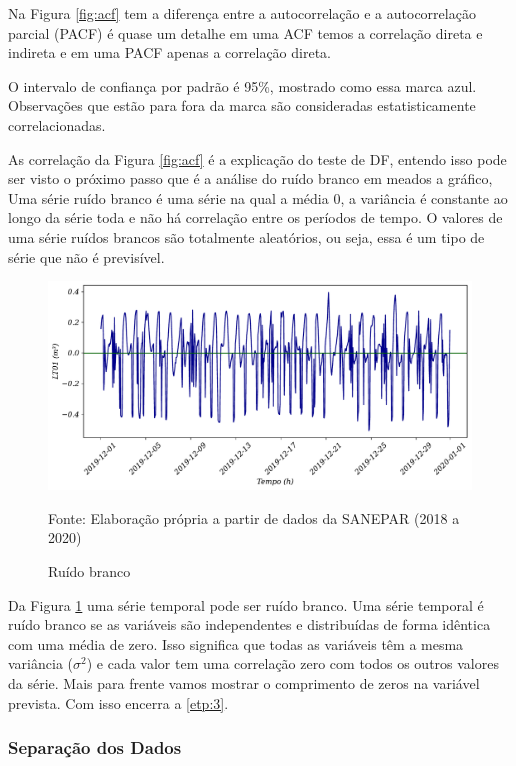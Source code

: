 Na Figura \ref{fig:acf} tem a diferença entre a autocorrelação e a autocorrelação parcial (PACF) é quase um detalhe em uma ACF temos a correlação direta e indireta e em uma PACF apenas a correlação direta. 

O intervalo de confiança por padrão é 95\%, mostrado como essa marca azul. Observações que estão para fora da marca são consideradas estatisticamente correlacionadas.

As correlação da Figura \ref{fig:acf} é a explicação do teste de DF, entendo isso pode ser visto o próximo passo que é  a análise do ruído branco em meados a gráfico, Uma série ruído branco é uma série na qual a média 0, a variância é constante ao longo da série toda e não há correlação entre os períodos de tempo. O valores de uma série ruídos brancos são totalmente aleatórios, ou seja, essa é um tipo de série que não é previsível.

\begin{figure}[H]
	\centering
	\caption{Ruído branco}
	\label{fig:ruido-branco}
	\includegraphics[width=1\linewidth]{Resultados/Figuras/ruido-branco}
	
	Fonte: Elaboração própria a partir de dados da SANEPAR (2018 a 2020)
\end{figure}

Da Figura \ref{fig:ruido-branco} uma série temporal pode ser ruído branco.
Uma série temporal é ruído branco se as variáveis são independentes e distribuídas de forma idêntica com uma média de zero.
Isso significa que todas as variáveis têm a mesma variância ($\sigma^2$) e cada valor tem uma correlação zero com todos os outros valores da série.
Mais para frente vamos mostrar o comprimento de zeros na variável prevista. Com isso encerra a \ref{etp:3}.

\subsubsection{Separa\c c\~ao dos Dados}

